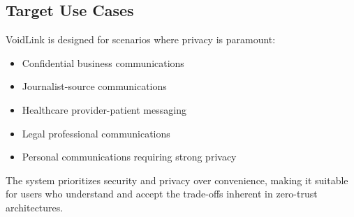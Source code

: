 \subsection{Target Use Cases}

VoidLink is designed for scenarios where privacy is paramount:
\begin{itemize}
    \item Confidential business communications
    \item Journalist-source communications
    \item Healthcare provider-patient messaging
    \item Legal professional communications
    \item Personal communications requiring strong privacy
\end{itemize}

The system prioritizes security and privacy over convenience, making it suitable for users who understand and accept the trade-offs inherent in zero-trust architectures.

